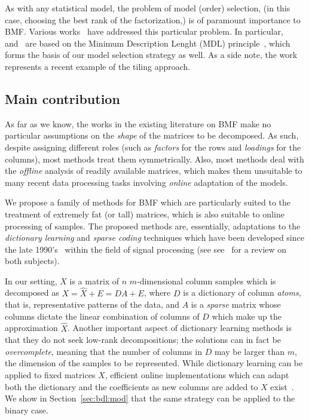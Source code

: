 \documentclass[twocolumn]{IEEEtran}
\theoremstyle{definition}
\begin{document}
As with any statistical model, the problem of model (order) selection, (in this case, choosing the best rank of the factorization,) is of paramount importance to BMF. Various works~\cite{bmf-mdl,bmf-tiling-mdl,bmf-sel} have addressed this particular problem. In particular,~\cite{bmf-mdl} and~\cite{bmf-tiling-mdl} are based on the Minimum Description Lenght (MDL) principle~\cite{mdl1,mdl2,mdl3}, which forms the basis of our model selection strategy as well. As a side note, the work~\cite{bmf-tiling-mdl} represents a recent example of the tiling approach.

\subsection{Main contribution}

As far as we know, the works in the existing literature on BMF make no particular assumptions on the \emph{shape} of the matrices to be decomposed. As such, despite assigning different roles (such as \emph{factors} for the rows and \emph{loadings} for the columns), most methods treat them symmetrically. Also, most methods deal with the \emph{offline} analysis of 
readily available matrices, which makes them unsuitable to many recent data processing tasks involving \emph{online} adaptation of the models.

We propose a family of methods for BMF which are particularly suited to the treatment of extremely fat (or tall) matrices, which is also suitable to online processing of samples. The proposed methods are, essentially, adaptations to the \emph{dictionary learning} and \emph{sparse coding} techniques which have been developed since the late 1990's~\cite{lewicki99,engan00,aharon06} within the field of signal processing (see see~\cite{dl-review} for a review on both subjects).

In our setting, $X$ is a matrix of $n$ $m$-dimensional column samples which is decomposed as $X=\hat{X}+E=DA+E$, where $D$ is a dictionary of column \emph{atoms}, that is, representative patterns of the data, and $A$ is a \emph{sparse} matrix whose columns dictate the linear combination of columns of $D$ which make up the approximation $\hat{X}$. Another important aspect of dictionary learning methods is that they do not seek low-rank decompositions; the solutions can in fact be \emph{overcomplete}, meaning that the number of columns in $D$ may be larger than $m$, the dimension of the samples to be represented. While dictionary learning can be applied to fixed matrices $X$, efficient online implementations which can adapt both the dictionary and the coefficients as new columns are added to $X$ exist~\cite{online-dl}. We show in Section~\ref{sec:bdl:mod} that the same strategy can be applied to the binary case.
\end{document}
